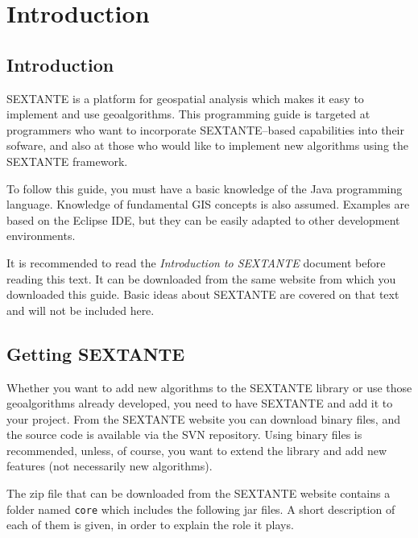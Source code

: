 \chapter{Introduction}

\section{Introduction}
 
SEXTANTE is a platform for geospatial analysis which makes it easy to implement and use geoalgorithms. This programming guide is targeted at programmers who want to incorporate SEXTANTE--based capabilities into their sofware, and also at those who would like to implement new algorithms using the SEXTANTE framework.

To follow this guide, you must have a basic knowledge of the Java programming language. Knowledge of fundamental GIS concepts is also assumed. Examples are based on the Eclipse IDE, but they can be easily adapted to other development environments.

It is recommended to read the \emph{Introduction to SEXTANTE} document before reading this text. It  can be downloaded from the same website from which you downloaded this guide. Basic ideas about SEXTANTE are covered on that text and will not be included here.
 
 \section{Getting SEXTANTE}

Whether you want to add new algorithms to the SEXTANTE library or use those geoalgorithms already developed, you need to have SEXTANTE and add it to your project. From the SEXTANTE website you can download binary files, and the source code is available via the SVN repository. Using binary files is recommended, unless, of course, you want to extend the library and add new features (not necessarily new algorithms). 


The zip file that can be downloaded from the SEXTANTE website contains a folder named \texttt{core} which includes the following jar files. A short description of each of them is given, in order to explain the role it plays.

